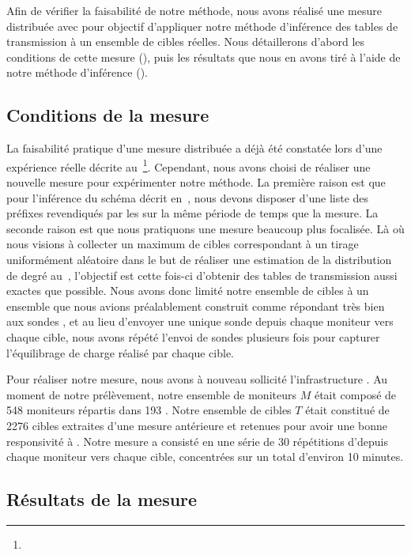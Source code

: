 Afin de vérifier la faisabilité de notre méthode, nous avons réalisé une mesure
\udpping distribuée avec pour objectif d'appliquer notre méthode d'inférence des
tables de transmission à un ensemble de cibles réelles. Nous détaillerons
d'abord les conditions de cette mesure
(), puis les résultats que nous en avons
tiré à l'aide de notre méthode d'inférence
().

\subsection{Conditions de la mesure}
\label{subsec:revtables-measurement-setup}
La faisabilité pratique d'une mesure \udpping distribuée a déjà été constatée
lors d'une expérience réelle décrite
au~\footnote{}.
Cependant, nous avons choisi de réaliser une nouvelle mesure pour expérimenter
notre méthode. La première raison est que pour l'inférence du schéma \as décrit
en~, nous devons disposer d'une liste des
préfixes revendiqués par les \as sur la même période de temps que la mesure. La
seconde raison est que nous pratiquons une mesure beaucoup plus focalisée. Là où
nous visions à collecter un maximum de cibles correspondant à un tirage
uniformément aléatoire dans le but de réaliser une estimation de la distribution
de degré au~, l'objectif est cette fois-ci d'obtenir des tables
de transmission aussi exactes que possible.
Nous avons donc limité notre ensemble de cibles à un ensemble que nous avions
préalablement construit comme répondant très bien aux sondes \udpping, et au
lieu d'envoyer une unique sonde \udpping depuis chaque moniteur vers chaque
cible, nous avons répété l'envoi de sondes plusieurs fois pour capturer
l'équilibrage de charge réalisé par chaque cible.

Pour réaliser notre mesure, nous avons à nouveau sollicité l'infrastructure
\planetlab. Au moment de notre prélèvement, notre ensemble de moniteurs $M$
était composé de 548 moniteurs répartis dans 193 \as. Notre ensemble de
cibles $T$ était constitué de 2276 cibles extraites d'une mesure antérieure et
retenues pour avoir une bonne responsivité à \udpping. Notre mesure a consisté
en une série de 30 répétitions d'\udpping depuis chaque moniteur vers chaque
cible, concentrées sur un total d'environ 10 minutes.

\subsection{Résultats de la mesure}
\label{subsec:revtables-measurement-results}

